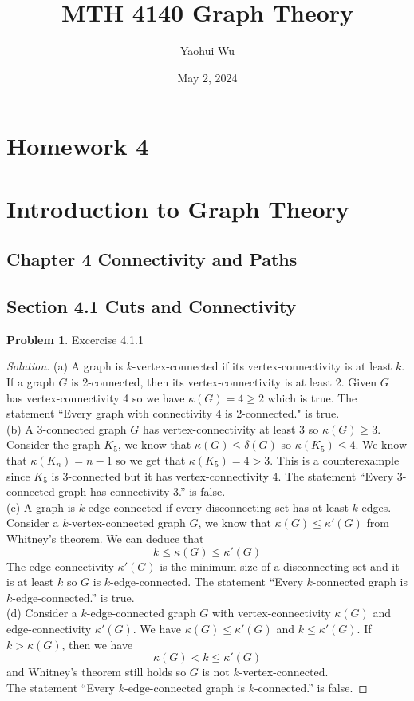 \documentclass[12pt]{article}
\title{MTH 4140 Graph Theory}
\author{Yaohui Wu}
\date{May 2, 2024}
\theoremstyle{definition}
\newtheorem{problem}{Problem}
\newenvironment*{solution}{\begin{proof}[Solution]}{\end{proof}}
\begin{document}
\maketitle
\section*{Homework 4}
\section*{Introduction to Graph Theory}

\subsection*{Chapter 4 Connectivity and Paths}
\subsection*{Section 4.1 Cuts and Connectivity}
\begin{problem}
    Excercise 4.1.1
\end{problem}
\begin{solution}
    (a) A graph is \(k\)-vertex-connected if its vertex-connectivity is at least \(k\).
    If a graph \(G\) is 2-connected, then its vertex-connectivity is at least 2.
    Given \(G\) has vertex-connectivity 4 so we have \(\kappa(G)=4\geq2\) which is true.
    The statement ``Every graph with connectivity 4 is 2-connected." is true. \\
    (b) A 3-connected graph \(G\) has vertex-connectivity at least 3 so \(\kappa(G)\geq3\).
    Consider the graph \(K_5\), we know that \(\kappa(G)\leq\delta(G)\) so \(\kappa(K_5)\leq4\).
    We know that \(\kappa(K_n)=n-1\) so we get that \(\kappa(K_5)=4>3\).
    This is a counterexample since \(K_5\) is 3-connected but it has vertex-connectivity 4.
    The statement ``Every 3-connected graph has connectivity 3.'' is false. \\
    (c) A graph is \(k\)-edge-connected if every disconnecting set has at least \(k\) edges.
    Consider a \(k\)-vertex-connected graph \(G\), we know that \(\kappa(G)\leq\kappa'(G)\) from Whitney's theorem.
    We can deduce that \[k \leq \kappa(G) \leq \kappa'(G) \]
    The edge-connectivity \(\kappa'(G)\) is the minimum size of a disconnecting set and it is at least \(k\) so \(G\) is \(k\)-edge-connected.
    The statement ``Every \(k\)-connected graph is \(k\)-edge-connected.'' is true. \\
    (d) Consider a \(k\)-edge-connected graph \(G\) with vertex-connectivity \(\kappa(G)\) and \\ edge-connectivity \(\kappa'(G)\).
    We have \(\kappa(G)\leq\kappa'(G)\) and \(k\leq\kappa'(G)\).
    If \(k>\kappa(G)\), then we have \[\kappa(G)<k\leq\kappa'(G)\] and Whitney's theorem still holds so \(G\) is not \(k\)-vertex-connected. \\
    The statement ``Every \(k\)-edge-connected graph is \(k\)-connected.'' is false.
\end{solution}
\end{document}
